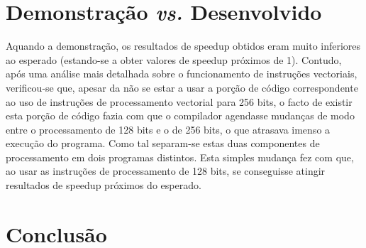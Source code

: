 \documentclass[a4paper]{article}
\begin{document}
	\section{Demonstração \textit{vs.} Desenvolvido}
	
	 Aquando a demonstração, os resultados de speedup obtidos eram muito inferiores ao esperado (estando-se a obter valores de speedup próximos de 1). Contudo, após uma análise mais detalhada sobre o funcionamento de instruções vectoriais, verificou-se que, apesar da não se estar a usar a porção de código correspondente ao uso de instruções de processamento vectorial para 256 bits, o facto de existir esta porção de código fazia com que o compilador agendasse mudanças de modo entre o processamento de 128 bits e o de 256 bits, o que atrasava imenso a execução do programa. Como tal separam-se estas duas componentes de processamento em dois programas distintos. Esta simples mudança fez com que, ao usar as instruções de processamento de 128 bits, se conseguisse atingir resultados de speedup próximos do esperado.
	   
	
	
	
	\section{Conclusão}
\end{document}
